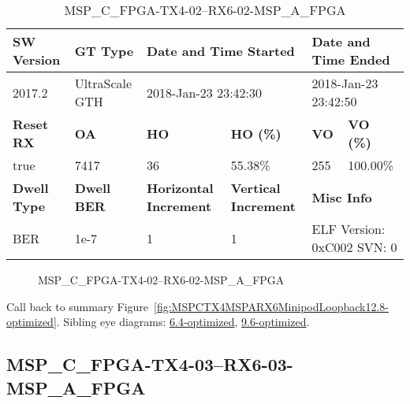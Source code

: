 \begin{table}[h]
\centering
\caption{MSP\_C\_FPGA-TX4-02--RX6-02-MSP\_A\_FPGA}
\label{tab:MSPCFPGATX402RX602MSPAFPGA12.8-optimized}
\begin{tabular}{@{}|l|l|l|l|l|l|@{}}
\toprule
\textbf{SW Version}                & \textbf{GT Type}   & \multicolumn{2}{l|}{\textbf{Date and Time Started}}            & \multicolumn{2}{l|}{\textbf{Date and Time Ended}}        \\ \midrule
2017.2                       & UltraScale GTH          & \multicolumn{2}{l|}{2018-Jan-23 23:42:30}                   & \multicolumn{2}{l|}{2018-Jan-23 23:42:50}               \\ \midrule
\textbf{Reset RX}                  & \textbf{OA} & \textbf{HO}   & \textbf{HO (\%)} & \textbf{VO} & \textbf{VO (\%)} \\ \midrule
true & 7417        & 36          & 55.38\%        & 255        & 100.00\%       \\ \midrule
\textbf{Dwell Type}                & \textbf{Dwell BER} & \textbf{Horizontal Increment} & \textbf{Vertical Increment}    & \multicolumn{2}{l|}{\textbf{Misc Info}}                  \\ \midrule
BER                            & 1e-7        & 1        & 1           & \multicolumn{2}{l|}{ELF Version: 0xC002 SVN: 0}                         \\ \bottomrule
\end{tabular}
\end{table}

\begin{figure}[h]
\caption{MSP\_C\_FPGA-TX4-02--RX6-02-MSP\_A\_FPGA} \label{fig:MSPCFPGATX402RX602MSPAFPGA12.8-optimized}
\end{figure}

Call back to summary Figure~\ref{fig:MSPCTX4MSPARX6MinipodLoopback12.8-optimized}.
Sibling eye diagrams: \hyperref[sec:MSPCFPGATX402RX602MSPAFPGA6.4-optimized]{6.4-optimized}, \hyperref[sec:MSPCFPGATX402RX602MSPAFPGA9.6-optimized]{9.6-optimized}.

\clearpage
\newpage


\subsection{MSP\_C\_FPGA-TX4-03--RX6-03-MSP\_A\_FPGA}\label{sec:MSPCFPGATX403RX603MSPAFPGA12.8-optimized}

